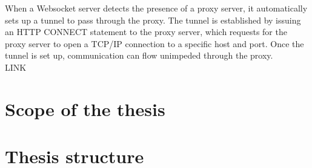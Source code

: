 When a Websocket server detects the presence of a proxy server, it automatically sets up a tunnel to pass through the proxy. The tunnel is established by issuing an HTTP CONNECT statement to the proxy server, which requests for the proxy server to open a TCP/IP connection to a specific host and port. Once the tunnel is set up, communication can flow unimpeded through the proxy.\\

LINK

\section{Scope of the thesis}
\section{Thesis structure}
